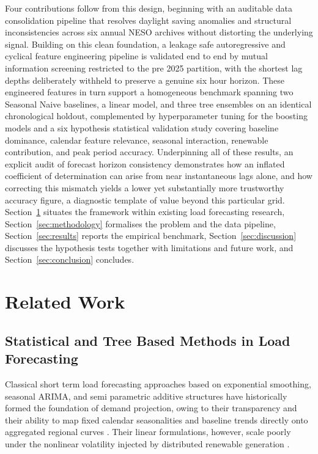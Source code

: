 \documentclass[runningheads]{llncs}
\begin{document}
Four contributions follow from this design, beginning with an auditable data consolidation pipeline that resolves daylight saving anomalies and structural inconsistencies across six annual NESO archives without distorting the underlying signal. Building on this clean foundation, a leakage safe autoregressive and cyclical feature engineering pipeline is validated end to end by mutual information screening restricted to the pre 2025 partition, with the shortest lag depths deliberately withheld to preserve a genuine six hour horizon. These engineered features in turn support a homogeneous benchmark spanning two Seasonal Naive baselines, a linear model, and three tree ensembles on an identical chronological holdout, complemented by hyperparameter tuning for the boosting models and a six hypothesis statistical validation study covering baseline dominance, calendar feature relevance, seasonal interaction, renewable contribution, and peak period accuracy. Underpinning all of these results, an explicit audit of forecast horizon consistency demonstrates how an inflated coefficient of determination can arise from near instantaneous lags alone, and how correcting this mismatch yields a lower yet substantially more trustworthy accuracy figure, a diagnostic template of value beyond this particular grid. Section~\ref{sec:related} situates the framework within existing load forecasting research, Section~\ref{sec:methodology} formalises the problem and the data pipeline, Section~\ref{sec:results} reports the empirical benchmark, Section~\ref{sec:discussion} discusses the hypothesis tests together with limitations and future work, and Section~\ref{sec:conclusion} concludes.

\section{Related Work}
\label{sec:related}

\subsection{Statistical and Tree Based Methods in Load Forecasting}

Classical short term load forecasting approaches based on exponential smoothing, seasonal ARIMA, and semi parametric additive structures have historically formed the foundation of demand projection, owing to their transparency and their ability to map fixed calendar seasonalities and baseline trends directly onto aggregated regional curves \cite{box2015time,zhang2003time}. Their linear formulations, however, scale poorly under the nonlinear volatility injected by distributed renewable generation \cite{hippert2001neural}.
\end{document}
